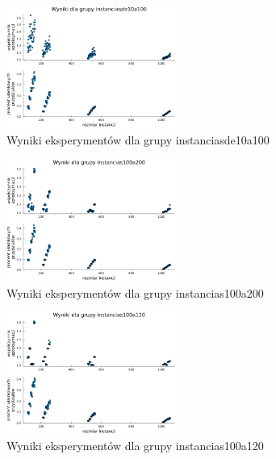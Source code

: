 \documentclass{article}
\begin{document}
\begin{figure}[h!]
    \centering
    \includegraphics[width=0.5\textwidth]{../approximation_ratio_group_instanciasde10a100.png}
    \caption{Wyniki eksperymentów dla grupy instanciasde10a100}
    \label{fig:group_instanciasde10a100}
\end{figure}

\begin{figure}[h!]
    \centering
    \includegraphics[width=0.5\textwidth]{../approximation_ratio_group_instancias100a200.png}
    \caption{Wyniki eksperymentów dla grupy instancias100a200}
    \label{fig:group_instancias100a200}
\end{figure}

\begin{figure}[h!]
    \centering
    \includegraphics[width=0.5\textwidth]{../approximation_ratio_group_instancias100a120.png}
    \caption{Wyniki eksperymentów dla grupy instancias100a120}
    \label{fig:group_instancias100a120}
\end{figure}
\end{document}
